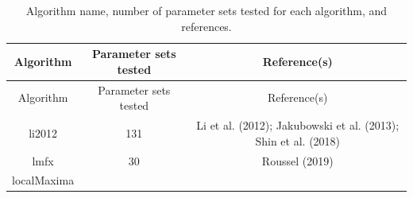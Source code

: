 \documentclass[]{article}
\begin{document}
\begin{longtable}[]{@{}ccc@{}}
\caption{Algorithm name, number of parameter sets tested for each
algorithm, and references.}\tabularnewline
\toprule
\begin{minipage}[b]{0.18\columnwidth}\centering\strut
Algorithm\strut
\end{minipage} & \begin{minipage}[b]{0.22\columnwidth}\centering\strut
Parameter sets tested\strut
\end{minipage} & \begin{minipage}[b]{0.34\columnwidth}\centering\strut
Reference(s)\strut
\end{minipage}\tabularnewline
\midrule
\endfirsthead
\toprule
\begin{minipage}[b]{0.18\columnwidth}\centering\strut
Algorithm\strut
\end{minipage} & \begin{minipage}[b]{0.22\columnwidth}\centering\strut
Parameter sets tested\strut
\end{minipage} & \begin{minipage}[b]{0.34\columnwidth}\centering\strut
Reference(s)\strut
\end{minipage}\tabularnewline
\midrule
\endhead
\begin{minipage}[t]{0.18\columnwidth}\centering\strut
li2012\strut
\end{minipage} & \begin{minipage}[t]{0.22\columnwidth}\centering\strut
131\strut
\end{minipage} & \begin{minipage}[t]{0.34\columnwidth}\centering\strut
Li et al. (2012); Jakubowski et al. (2013); Shin et al. (2018)\strut
\end{minipage}\tabularnewline
\begin{minipage}[t]{0.18\columnwidth}\centering\strut
lmfx\strut
\end{minipage} & \begin{minipage}[t]{0.22\columnwidth}\centering\strut
30\strut
\end{minipage} & \begin{minipage}[t]{0.34\columnwidth}\centering\strut
Roussel (2019)\strut
\end{minipage}\tabularnewline
\begin{minipage}[t]{0.18\columnwidth}\centering\strut
localMaxima\strut
\end{minipage} & \begin{minipage}[t]{0.22\columnwidth}\centering\strut

\end{minipage}
\end{longtable}
\end{document}
